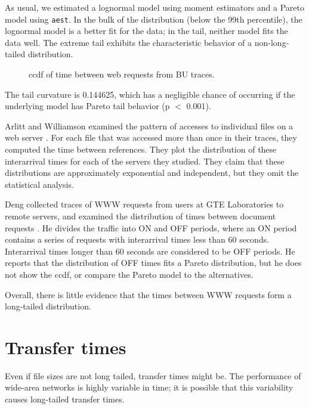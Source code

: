 \documentclass[twocolumn,11pt]{infocom}
\begin{document}
As usual, we estimated a lognormal model using moment estimators
and a Pareto model using \texttt{aest}.
In the bulk of the distribution (below the 99th percentile),
the lognormal model is a better fit for the data; in the tail, neither
model fits the data well.  The extreme tail exhibits
the characteristic behavior of a non-long-tailed distribution.

\begin{figure}[tb]
\centerline{}
\caption{ccdf of time between web requests from BU traces.}
\label{fig.crovella}
\end{figure}

The tail curvature is 0.144625, which has a negligible
chance of occurring if the underlying model has
Pareto tail behavior (p $<$ 0.001).

Arlitt and Williamson examined the pattern of accesses to individual
files on a web server \cite{ArlittWilliamson96}.  For each file that
was accessed more than once in their traces, they computed the
time between references.  They plot the distribution of these
interarrival times for each of the servers they studied.  They
claim that these distributions are approximately exponential
and independent, but they omit the statistical analysis.

Deng collected traces of WWW requests from users at GTE Laboratories
to remote servers, and examined the distribution of times between
document requests \cite{Deng96Empirical}.  He divides the traffic into
ON and OFF periods, where an ON period contains a series of requests
with interarrival times less than 60 seconds.  Interarrival times
longer than 60 seconds are considered to be OFF periods.  He reports
that the distribution of OFF times fits a Pareto distribution, but
he does not show the ccdf, or compare the Pareto model to the alternatives.

Overall, there is little evidence that the times between
WWW requests form a long-tailed distribution.



\section {Transfer times}

Even if file sizes are not long tailed, transfer times might be.
The performance of wide-area networks is highly variable in time; it
is possible that this variability causes long-tailed transfer times.
\end{document}
